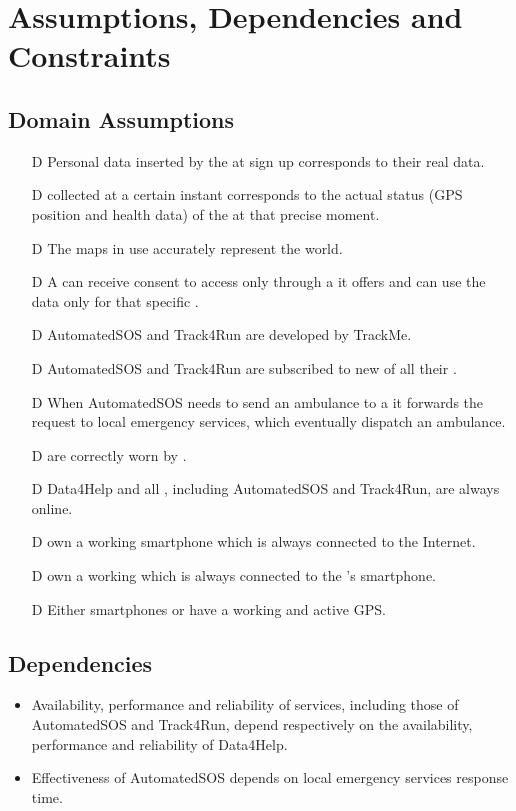 \documentclass[../../rasd.tex]{subfiles}
\begin{document}
\section{Assumptions, Dependencies and Constraints}
	\subsection{Domain Assumptions}
	 	\begin{itemize}
		 	\item[D\subs{1}]Personal data inserted by the  at sign up corresponds to their real data.
			\item[D\subs{2}] collected at a certain instant corresponds to the actual status (GPS position and health data) of the  at that precise moment.				
			\item[D\subs{3}]The maps in use accurately represent the world.
			\item[D\subs{4}]A  can receive consent to  access only through a  it offers and can use the data only for that specific .
			\item[D\subs{5}]AutomatedSOS and Track4Run are  developed by TrackMe.
			\item[D\subs{6}]AutomatedSOS and Track4Run are subscribed to new  of all their .
			\item[D\subs{7}]When AutomatedSOS needs to send an ambulance to a  it forwards the request to local emergency services, which eventually dispatch an ambulance.
			\item[D\subs{8}] are correctly worn by .
			\item[D\subs{9}]Data4Help and all , including AutomatedSOS and Track4Run, are always online.
			\item[D\subs{10}] own a working smartphone which is always connected to the Internet.
			\item[D\subs{11}] own a working  which is always connected to the 's smartphone.
			\item[D\subs{12}]Either smartphones or  have a working and active GPS.
		\end{itemize}	
	\subsection{Dependencies}
		\begin{itemize}
			\item Availability, performance and reliability of services, including those of AutomatedSOS and Track4Run, depend respectively on the availability, performance and reliability of Data4Help.
			\item Effectiveness of AutomatedSOS depends on local emergency services response time.
		\end{itemize}
\end{document}
